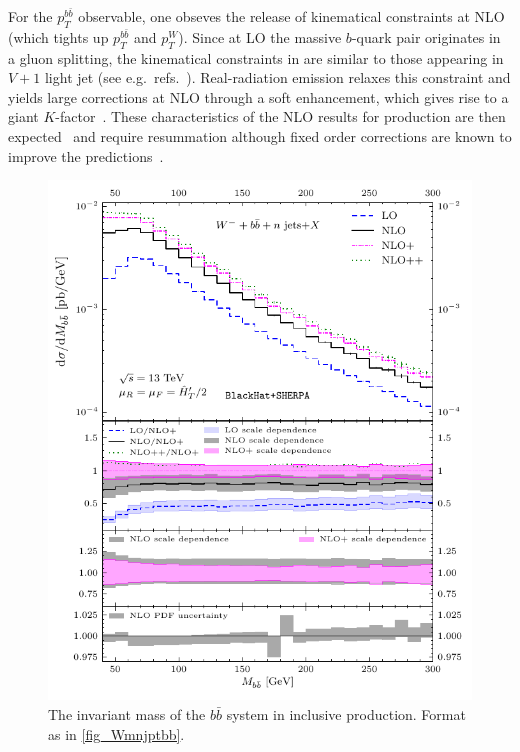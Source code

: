 For the $p_T^{b\bar b}$ observable, one obseves the release of
kinematical constraints at NLO (which tights up $p_T^{b\bar b}$ and $p_T^W$).
Since at LO the massive $b$-quark pair
originates in a gluon splitting, the kinematical constraints in \Wbb{} are
similar to those appearing in $V+1$ light jet (see e.g.\ refs.~\cite{BH:W3jPRL,BH:W4j,BH:W5j}). Real-radiation emission relaxes this
constraint and yields large corrections at NLO through a soft enhancement, which
gives rise to a giant $K$-factor~\cite{Rubin:2010xp}. These characteristics of
the NLO results for \Wbb{} production are then expected~\cite{Catani:1997xc} and
require resummation although fixed order corrections are known to improve the
predictions~\cite{Ridder:2015dxa}.


\begin{figure}[ht]
  \centering
  \includegraphics[clip,scale=1]{plots/excl_mbb_v4}
  \caption{The invariant mass of the $b\bar b$ system in inclusive \Wbbm{} production. Format as in \cref{fig_Wmnjptbb}.}
  \label{fig_Wmnjmbb}
\end{figure}

